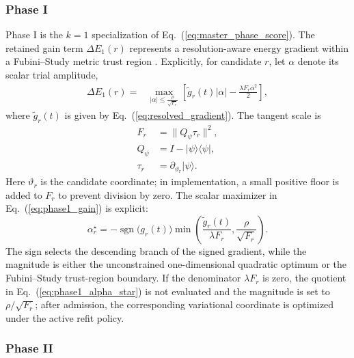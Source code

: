 \documentclass[
  reprint,
  amsmath,
  amssymb,
  aps,
  pra,
  nofootinbib,
  superscriptaddress,
  floatfix
]{revtex4-2}
\newcommand{\ket}[1]{|#1\rangle}
\newcommand{\bra}[1]{\langle #1|}
\begin{document}
\subsubsection{Phase I}

Phase I is the $k=1$ specialization of Eq.~(\ref{eq:master_phase_score}). The retained gain term $\Delta E_{1}(r)$ represents a resolution-aware energy gradient within a Fubini--Study metric trust region \cite{Nocedal2006TrustRegion}. Explicitly, for candidate $r$, let $\alpha$ denote its scalar trial amplitude,
\begin{equation}
\begin{split}
\Delta E_{1}(r)={}&\max_{|\alpha|\le \frac{\rho}{\sqrt{F_r}}} \left[\widetilde g_r(t)|\alpha|-\frac{\lambda F_r\alpha^2}{2}\right],
\end{split}
\label{eq:phase1_gain}
\end{equation}
where $\widetilde g_r(t)$ is given by Eq.~(\ref{eq:resolved_gradient}). The tangent scale is
\begin{equation}
\begin{aligned}
F_r&=\|Q_\psi\tau_r\|^2,\\
Q_\psi&=I-\ket{\psi}\bra{\psi},\\
\tau_r&=\partial_{\vartheta_r}\ket{\psi}.
\end{aligned}
\label{eq:phase1_tangent_scale}
\end{equation}
Here $\vartheta_r$ is the candidate coordinate; in implementation, a small positive floor is added to $F_r$ to prevent division by zero.
The scalar maximizer in Eq.~(\ref{eq:phase1_gain}) is explicit:
\begin{equation}
\alpha_r^\star
=
-\operatorname{sgn}\!\bigl(g_r(t)\bigr)
\min\!\left(
\dfrac{\widetilde g_r(t)}{\lambda F_r},
\dfrac{\rho}{\sqrt{F_r}}
\right).
\label{eq:phase1_alpha_star}
\end{equation}
The sign selects the descending branch of the signed gradient, while the magnitude is either the unconstrained one-dimensional quadratic optimum or the Fubini--Study trust-region boundary. If the denominator $\lambda F_r$ is zero, the quotient in Eq.~(\ref{eq:phase1_alpha_star}) is not evaluated and the magnitude is set to $\rho/\sqrt{F_r}$; after admission, the corresponding variational coordinate is optimized under the active refit policy.

\subsubsection{Phase II}
\end{document}

